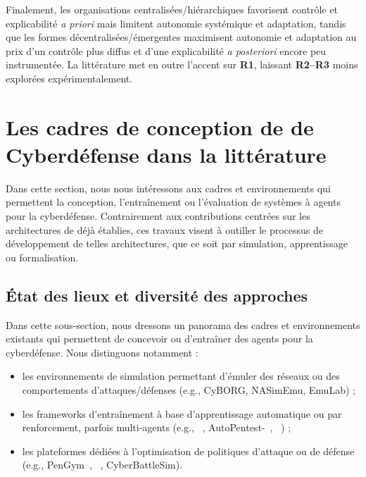 Finalement, les organisations centralisées/hiérarchiques favorisent contrôle et explicabilité \emph{a priori} mais limitent autonomie systémique et adaptation, tandis que les formes décentralisées/émergentes maximisent autonomie et adaptation au prix d'un contrôle plus diffus et d'une explicabilité \emph{a posteriori} encore peu instrumentée. La littérature met en outre l'accent sur \textbf{R1}, laissant \textbf{R2--R3} moins explorées expérimentalement.



\section{Les cadres de conception de  de Cyberdéfense dans la littérature}\label{sec:sma-cyberdefense-conception}

Dans cette section, nous nous intéressons aux cadres et environnements qui permettent la conception, l'entraînement ou l'évaluation de systèmes à agents pour la cyberdéfense. Contrairement aux contributions centrées sur les architectures de  déjà établies, ces travaux visent à outiller le processus de développement de telles architectures, que ce soit par simulation, apprentissage ou formalisation.

\subsection{État des lieux et diversité des approches}

Dans cette sous-section, nous dressons un panorama des cadres et environnements existants qui permettent de concevoir ou d'entraîner des agents pour la cyberdéfense. Nous distinguons notamment :
\begin{itemize}
  \item les environnements de simulation permettant d'émuler des réseaux ou des comportements d'attaques/défenses (e.g., CyBORG, NASimEmu, EmuLab) ;
  \item les frameworks d'entraînement à base d'apprentissage automatique ou par renforcement, parfois multi-agents (e.g., ~\cite{Hammar2023}, \allowbreak AutoPentest-~\cite{CROND}, ~\cite{10.1145/2739482.2768429}) ;
  \item les plateformes dédiées à l'optimisation de politiques d'attaque ou de défense (e.g., PenGym~\cite{Nguyen2025}, ~\cite{Hammar2023}, CyberBattleSim).
\end{itemize}%

